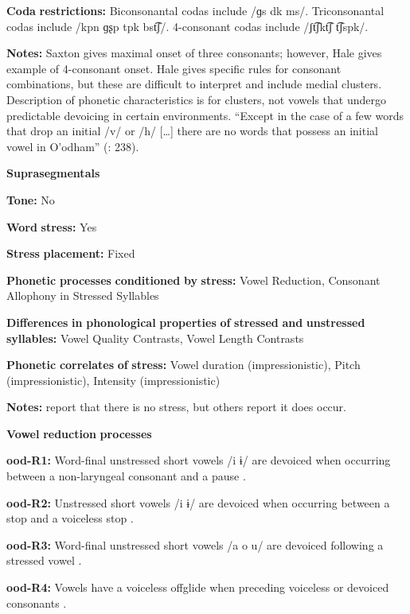 \begin{styleBody}
\textbf{Coda} \textbf{restrictions:} Biconsonantal codas include /ɡs dk ms/. Triconsonantal codas include /kpn ɡʂp tpk bst͡ʃ/. 4-consonant codas include /ʃt͡ʃkt͡ʃ t͡ʃspk/.

\textbf{Notes:} Saxton gives maximal onset of three consonants; however, Hale gives example of 4-consonant onset. Hale gives specific rules for consonant combinations, but these are difficult to interpret and include medial clusters. Description of phonetic characteristics is for clusters, not vowels that undergo predictable devoicing in certain environments. “Except in the case of a few words that drop an initial /v/ or /h/ […] there are no words that possess an initial vowel in O’odham” (\citealt{DoloresMathiot1991}: 238).

\textbf{Suprasegmentals}

\textbf{Tone:} No

\textbf{Word} \textbf{stress:} Yes

\textbf{Stress} \textbf{placement:} Fixed

\textbf{Phonetic} \textbf{processes} \textbf{conditioned} \textbf{by} \textbf{stress:} Vowel Reduction, Consonant Allophony in Stressed Syllables

\textbf{Differences} \textbf{in} \textbf{phonological} \textbf{properties} \textbf{of} \textbf{stressed} \textbf{and} \textbf{unstressed} \textbf{syllables:} Vowel Quality Contrasts, Vowel Length Contrasts

\textbf{Phonetic} \textbf{correlates} \textbf{of} \textbf{stress:} Vowel duration (impressionistic), Pitch (impressionistic), Intensity (impressionistic)

\textbf{Notes:} \citet{DoloresMathiot1991} report that there is no stress, but others report it does occur.

\textbf{Vowel} \textbf{reduction} \textbf{processes}

\textbf{ood-R1:} Word-final unstressed short vowels /i ɨ/ are devoiced when occurring between a non-laryngeal consonant and a pause \citep[31]{Saxton1963}.

\textbf{ood-R2:} Unstressed short vowels /i ɨ/ are devoiced when occurring between a stop and a voiceless stop \citep[31]{Saxton1963}.

\textbf{ood-R3:} Word-final unstressed short vowels /a o u/ are devoiced following a stressed vowel \citep[31]{Saxton1963}.

\textbf{ood-R4:} Vowels have a voiceless offglide when preceding voiceless or devoiced consonants \citep[31]{Saxton1963}.


\end{styleBody}
